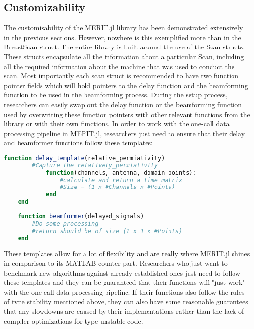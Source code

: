 \subsection{Customizability}
The customizability of the MERIT.jl library has been demonstrated extensively in the previous sections. However, nowhere
is this exemplified more than in the BreastScan struct. The entire library is built around the use of the Scan structs.
These structs encapsulate all the information about a particular Scan, including all the required information about the
machine that was used to conduct the scan. Most importantly each scan struct is recommended to have two function pointer
fields which will hold pointers to the delay function and the beamforming function to be used in the beamforming
process. During the setup process, researchers can easily swap out the delay function or the beamforming function used
by overwriting these function pointers with other relevant functions from the library or with their own functions. In
order to work with the one-call data processing pipeline in MERIT.jl, researchers just need to ensure that their delay
and beamformer functions follow these templates:
\begin{lstlisting}[language=Julia]
    function delay_template(relative_permiativity)
        #Capture the relatively_permiativity
            function(channels, antenna, domain_points):
                #calculate and return a time matrix
                #Size = (1 x #Channels x #Points)
            end
    end
    
    function beamformer(delayed_signals)
        #Do some processing
        #return should be of size (1 x 1 x #Points)
    end
\end{lstlisting}
These templates allow for a lot of flexibility and are really where MERIT.jl shines in comparison to its MATLAB counter
part. Researchers who just want to benchmark new algorithms against already established ones just need to follow these
templates and they can be guaranteed that their functions will "just work" with the one-call data processing pipeline.
If their functions also follow the rules of type stability mentioned above, they can also have some reasonable
guarantees that any slowdowns are caused by their implementations rather than the lack of compiler optimizations for
type unstable code.

